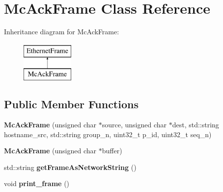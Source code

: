 \hypertarget{classMcAckFrame}{\section{Mc\-Ack\-Frame Class Reference}
\label{classMcAckFrame}
}
Inheritance diagram for Mc\-Ack\-Frame\-:\begin{figure}[H]
\begin{center}
\leavevmode
\includegraphics[height=2.000000cm]{classMcAckFrame}
\end{center}
\end{figure}
\subsection*{Public Member Functions}
\begin{DoxyCompactItemize}
\item 
\hypertarget{classMcAckFrame_a6e70d4033528f132e5fa7c08b7b49135}{{\bfseries Mc\-Ack\-Frame} (unsigned char $\ast$source, unsigned char $\ast$dest, std\-::string hostname\-\_\-src, std\-::string group\-\_\-n, uint32\-\_\-t p\-\_\-id, uint32\-\_\-t seq\-\_\-n)}\label{classMcAckFrame_a6e70d4033528f132e5fa7c08b7b49135}

\item 
\hypertarget{classMcAckFrame_abff33c23c0d5856bce2a58ddb00adfec}{{\bfseries Mc\-Ack\-Frame} (unsigned char $\ast$buffer)}\label{classMcAckFrame_abff33c23c0d5856bce2a58ddb00adfec}

\item 
\hypertarget{classMcAckFrame_afb5e987edd755ee472f719b92b71f3e1}{std\-::string {\bfseries get\-Frame\-As\-Network\-String} ()}\label{classMcAckFrame_afb5e987edd755ee472f719b92b71f3e1}

\item 
\hypertarget{classMcAckFrame_a4fc78bb69f8e45e06da316915c74cf76}{void {\bfseries print\-\_\-frame} ()}\label{classMcAckFrame_a4fc78bb69f8e45e06da316915c74cf76}

\end{DoxyCompactItemize}
